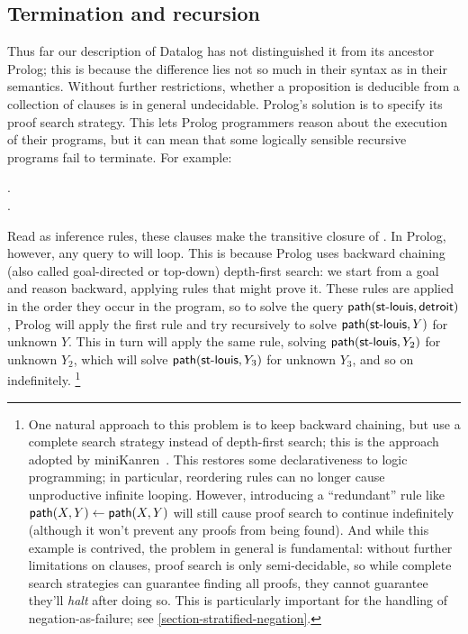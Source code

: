 
\subsection{Termination and recursion}

Thus far our description of Datalog has not distinguished it from its ancestor
Prolog; this is because the difference lies not so much in their syntax as in
their semantics.
%
Without further restrictions, whether a proposition is deducible from a
collection of clauses is in general undecidable.
%
Prolog's solution is to specify its proof search strategy.
%
This lets Prolog programmers reason about the execution of their programs, but
it can mean that some logically sensible recursive programs fail to terminate.
For example:

\begin{datalog}
 \gets {} \conj {}.\\
 \gets {}.
\end{datalog}

\noindent
Read as inference rules, these clauses make  the transitive closure
of .
%
In Prolog, however, any query to  will loop.
%
This is because Prolog uses backward chaining (also called goal-directed or
top-down) depth-first search: we start from a goal and reason backward, applying
rules that might prove it.
%
These rules are applied in the order they occur in the program, so to solve the
query $\text{\sffamily path}({\textsf{st-louis}, \textsf{detroit}})$, Prolog will apply the
first rule and try recursively to solve $\text{\sffamily path}({\textsf{st-louis},Y})$ for
unknown $Y$.
%
This in turn will apply the same rule, solving $\text{\sffamily path}({\textsf{st-louis},
  Y_2})$ for unknown $Y_2$, which will solve $\text{\sffamily path}({\textsf{st-louis}, Y_3})$
for unknown $Y_3$, and so on indefinitely.%
%
\footnote{One natural approach to this problem is to keep backward chaining, but
  use a complete search strategy instead of depth-first search; this is the
  approach adopted by miniKanren~\citep{kanren}. This restores some
  declarativeness to logic programming; in particular, reordering rules can no
  longer cause unproductive infinite looping. However, introducing a
  ``redundant'' rule like $\text{\sffamily path}({X,Y}) \gets \text{\sffamily path}({X,Y})$ will still
  cause proof search to continue indefinitely (although it won't prevent any
  proofs from being found). And while this example is contrived, the problem in
  general is fundamental: without further limitations on clauses, proof search
  is only semi-decidable, so while complete search strategies can guarantee
  finding all proofs, they cannot guarantee they'll \emph{halt} after doing so.
  This is particularly important for the handling of negation-as-failure; see
  \cref{section-stratified-negation}.}

